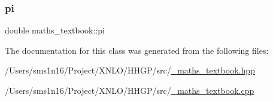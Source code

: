 \subsubsection{\texorpdfstring{pi}{pi}}
{\footnotesize\ttfamily double maths\+\_\+textbook\+::pi}



The documentation for this class was generated from the following files\+:\begin{DoxyCompactItemize}
\item 
/\+Users/sms1n16/\+Project/\+X\+N\+L\+O/\+H\+H\+G\+P/src/\hyperlink{__maths__textbook_8hpp}{\+\_\+maths\+\_\+textbook.\+hpp}\item 
/\+Users/sms1n16/\+Project/\+X\+N\+L\+O/\+H\+H\+G\+P/src/\hyperlink{__maths__textbook_8cpp}{\+\_\+maths\+\_\+textbook.\+cpp}\end{DoxyCompactItemize}
